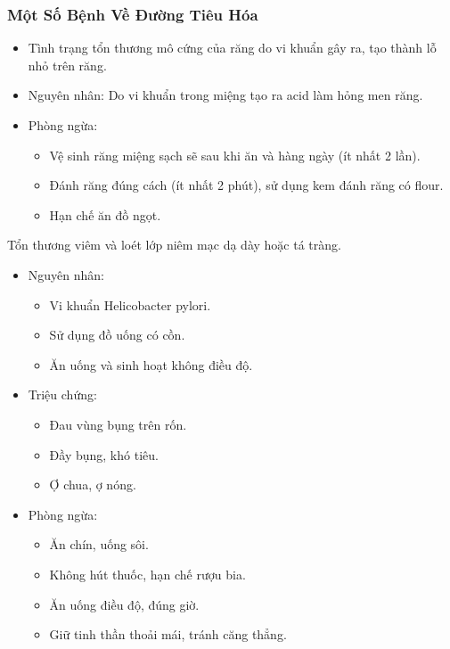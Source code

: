 \documentclass[Main.tex]{subfiles}
\begin{document}
\subsubsection{Một Số Bệnh Về Đường Tiêu Hóa}
    \begin{tomtat}
        \begin{itemize}
        	\item Tình trạng tổn thương mô cứng của răng do vi khuẩn gây ra, tạo thành lỗ nhỏ trên răng.
            \item Nguyên nhân: Do vi khuẩn trong miệng tạo ra acid làm hỏng men răng.
            \item Phòng ngừa:
                \begin{itemize}
                    \item Vệ sinh răng miệng sạch sẽ sau khi ăn và hàng ngày (ít nhất 2 lần).
                    \item Đánh răng đúng cách (ít nhất 2 phút), sử dụng kem đánh răng có flour.
                    \item Hạn chế ăn đồ ngọt.
                \end{itemize}
        \end{itemize}
    \end{tomtat}
    \begin{tomtat}
    	Tổn thương viêm và loét lớp niêm mạc dạ dày hoặc tá tràng.
        \begin{itemize}
            \item Nguyên nhân:
                \begin{itemize}
                    \item Vi khuẩn Helicobacter pylori.
                    \item Sử dụng đồ uống có cồn.
                    \item Ăn uống và sinh hoạt không điều độ.
                \end{itemize}
            \item Triệu chứng:
                \begin{itemize}
                    \item Đau vùng bụng trên rốn.
                    \item Đầy bụng, khó tiêu.
                    \item Ợ chua, ợ nóng.
                \end{itemize}
            \item Phòng ngừa:
                \begin{itemize}
                    \item Ăn chín, uống sôi.
                    \item Không hút thuốc, hạn chế rượu bia.
                    \item Ăn uống điều độ, đúng giờ.
                    \item Giữ tinh thần thoải mái, tránh căng thẳng.
                \end{itemize}
        \end{itemize}
    \end{tomtat}
\end{document}
